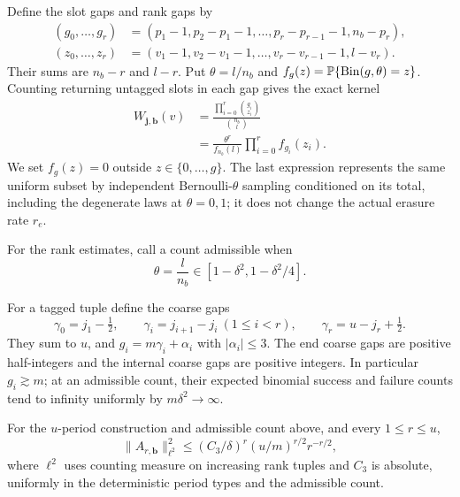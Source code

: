 Define the slot gaps and rank gaps by
\[
\begin{aligned}
 (g_0,\ldots,g_r)
   &=(p_1-1,p_2-p_1-1,\ldots,p_r-p_{r-1}-1,n_b-p_r),\\
 (z_0,\ldots,z_r)
   &=(v_1-1,v_2-v_1-1,\ldots,v_r-v_{r-1}-1,l-v_r).
\end{aligned}
\]
Their sums are \(n_b-r\) and \(l-r\). Put \(\theta=l/n_b\) and
\(f_g(z)=\mathbb P\{\operatorname{Bin}(g,\theta)=z\}\). Counting returning untagged slots in each gap gives the exact kernel
\begin{equation}\label{eq:base-rank-kernel}
\begin{aligned}
 W_{\mathbf j,\mathbf b}(v)
 &=\frac{\prod_{i=0}^{r}\binom{g_i}{z_i}}{\binom{n_b}{l}}\\
 &=\frac{\theta^r}{f_{n_b}(l)}
       \prod_{i=0}^{r}f_{g_i}(z_i).
\end{aligned}
\end{equation}
We set \(f_g(z)=0\) outside \(z\in\{0,\ldots,g\}\). The last expression represents the same uniform subset by independent Bernoulli-\(\theta\) sampling conditioned on its total, including the degenerate laws at \(\theta=0,1\); it does not change the actual erasure rate \(r_e\).

For the rank estimates, call a count admissible when
\[
 \theta=\frac{l}{n_b}\in[1-\delta^2,1-\delta^2/4].
\]

For a tagged tuple define the coarse gaps
\[
 \gamma_0=j_1-\tfrac12,\qquad
 \gamma_i=j_{i+1}-j_i\ (1\le i<r),\qquad
 \gamma_r=u-j_r+\tfrac12.
\]
They sum to \(u\), and \(g_i=m\gamma_i+\alpha_i\) with
\(|\alpha_i|\le3\). The end coarse gaps are positive half-integers and the internal coarse gaps are positive integers. In particular \(g_i\gtrsim m\); at an admissible count, their expected binomial success and failure counts tend to infinity uniformly by \(m\delta^2\to\infty\).

\begin{lemma}\label{lem:base-kernel}
For the \(u\)-period construction and admissible count above, and every \(1\le r\le u\),
\begin{equation}\label{eq:abase}
 \|A_{r,\mathbf b}\|_{\ell^2}^2
 \le (C_3/\delta)^r(u/m)^{r/2}r^{-r/2},
\end{equation}
where \(\ell^2\) uses counting measure on increasing rank tuples and \(C_3\) is absolute, uniformly in the deterministic period types and the admissible count.
\end{lemma}

